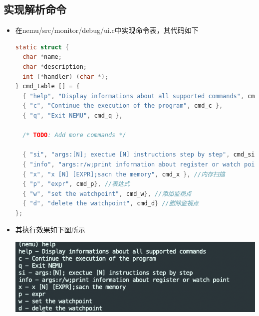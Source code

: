 \documentclass[UTF8,a4paper,10pt]{ctexart}
\begin{document}
\subsection{实现解析命令}
\begin{itemize}
  \item 在nemu/src/monitor/debug/ui.c中实现命令表，其代码如下
  \begin{lstlisting}[language = C]
static struct {
  char *name;
  char *description;
  int (*handler) (char *);
} cmd_table [] = {
  { "help", "Display informations about all supported commands", cmd_help },
  { "c", "Continue the execution of the program", cmd_c },
  { "q", "Exit NEMU", cmd_q },

  /* TODO: Add more commands */

  { "si", "args:[N]; exectue [N] instructions step by step", cmd_si}, //让程序单步执行 N 条指令后暂停执行, 当N没有给出时, 缺省为1
  { "info", "args:r/w;print information about register or watch point ", cmd_info}, //打印寄存器状态
  { "x", "x [N] [EXPR];sacn the memory", cmd_x }, //内存扫描
  { "p", "expr", cmd_p}, //表达式
  { "w", "set the watchpoint", cmd_w}, //添加监视点
  { "d", "delete the watchpoint", cmd_d} //删除监视点
};
  \end{lstlisting}
  \item 其执行效果如下图所示
  \begin{center}
    \includegraphics[scale = 0.6]{4}
  \end{center}
  
\end{itemize}
\end{document}
